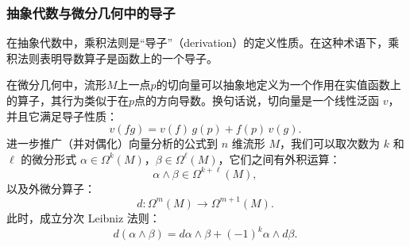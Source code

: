 \subsubsection{抽象代数与微分几何中的导子}
在抽象代数中，乘积法则是“导子”（derivation）的定义性质。在这种术语下，乘积法则表明导数算子是函数上的一个导子。

在微分几何中，流形$M$上一点$p$的切向量可以抽象地定义为一个作用在实值函数上的算子，其行为类似于在$p$点的方向导数。换句话说，切向量是一个线性泛函 $v$，并且它满足导子性质：
$$
v(fg) = v(f)\, g(p) + f(p)\, v(g).~
$$
进一步推广（并对偶化）向量分析的公式到 $n$ 维流形 $M$，我们可以取次数为 $k$ 和 $\ell$ 的微分形式 $\alpha \in \Omega^k(M)$，$\beta \in \Omega^\ell(M)$，它们之间有外积运算：
$$
\alpha \wedge \beta \in \Omega^{k+\ell}(M),~
$$
以及外微分算子：
$$
d : \Omega^m(M) \to \Omega^{m+1}(M).~
$$
此时，成立分次 Leibniz 法则：
$$
d(\alpha \wedge \beta) = d\alpha \wedge \beta + (-1)^k \alpha \wedge d\beta.~
$$
